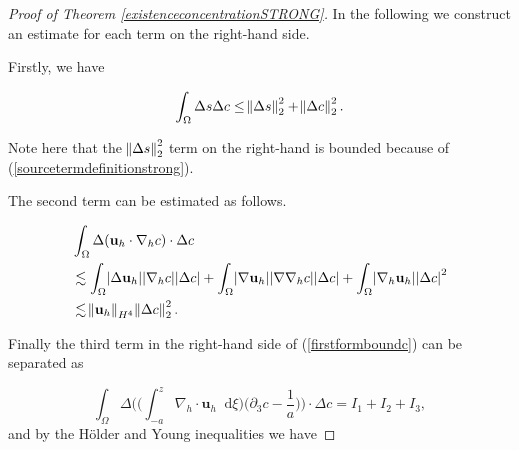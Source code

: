 \documentclass[11pt]{article}
\newcommand*\diff{\mathop{}\!\mathrm{d}}
\begin{document}
\begin{proof}[Proof of Theorem \ref{existenceconcentrationSTRONG}]
In the following we construct an estimate for each term on the right-hand side.

Firstly, we have

\begin{equation} \label{term1estimateGE}
\int_\Omega \Delta s \Delta c \leq \norm{\Delta s}_2^2 + \norm{\Delta c}_2^2.
\end{equation}

Note here that the $\norm{\Delta s}_2^2$ term on the right-hand is bounded because of (\ref{sourcetermdefinitionstrong}).

The second term can be estimated as follows.

\begin{equation} \label{term2estimateGE}
\begin{split}
& \int_\Omega \Delta ( \mathbf{u}_h \cdot \nabla_h c) \cdot \Delta c \\
& \lesssim \int_\Omega \abs{\Delta \mathbf{u}_h} \abs{\nabla_h c} \abs{\Delta c} + \int_\Omega \abs{\nabla \mathbf{u}_h} \abs{\nabla \nabla_h c} \abs{\Delta c} + \int_\Omega \abs{\nabla_h \mathbf{u}_h} \abs{\Delta c}^2 \\
& \lesssim \norm{\mathbf{u}_h}_{H^4} \norm{\Delta c}_2^2.
\end{split}
\end{equation}

Finally the third term in the right-hand side of (\ref{firstformboundc}) can be separated as

$$\int_\Omega \Delta \bigg ( \bigg ( \int_{-a}^z \nabla_h \cdot \mathbf{u}_h \diff \xi \bigg) \bigg ( \partial_3 c - \frac{1}{a}\bigg) \bigg ) \cdot \Delta c = I_1 + I_2 + I_3,$$
%
and by the H\"older and Young inequalities we have


\end{proof}
\end{document}
